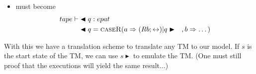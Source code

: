 \documentclass{article}
\begin{document}
\begin{enumerate}
\begin{itemize}
			\item {} must become  
			\begin{align*}
			tape \vdash &\blacktriangleleft q : epat \\
			&\blacktriangleleft q = \textsc{caseR}( a \Rightarrow (Rb;\leftrightarrow) \vert q \blacktriangleright \quad, b \Rightarrow \dots ) 
			\end{align*}
		\end{itemize}
	\end{enumerate}
	
	
	With this we have a translation scheme to translate any TM to our model.
	If \(s\) is the start state of the TM, we can use \(s \blacktriangleright\) to emulate the TM.
	(One must still proof that the executions will yield the same result...)
	
	
	
\end{document}
